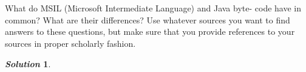 \documentclass[11pt, a4paper]{article}
\newtheorem*{solution}{\emph{Solution}}
\begin{document}
\section{}
	
What do MSIL (Microsoft Intermediate Language) and Java byte- code have in common? What are their differences?
Use whatever sources you want to find answers to these questions, but make sure that you provide references to your sources in proper scholarly fashion.

\begin{solution}\end{solution}~\\
	
\end{document}
